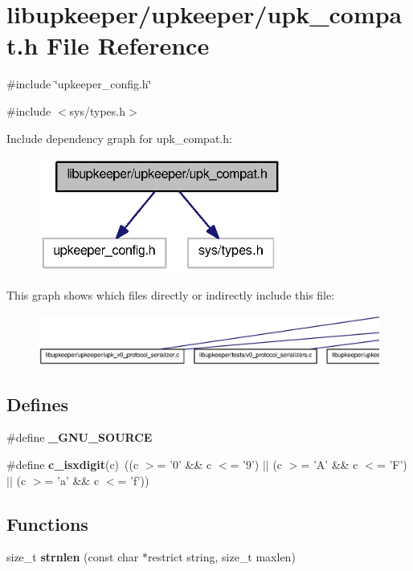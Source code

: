 \section{libupkeeper/upkeeper/upk\_\-compat.h File Reference}
\label{upk__compat_8h}
{\ttfamily \#include \char`\"{}upkeeper\_\-config.h\char`\"{}}\par
{\ttfamily \#include $<$sys/types.h$>$}\par
Include dependency graph for upk\_\-compat.h:
\nopagebreak
\begin{figure}[H]
\begin{center}
\leavevmode
\includegraphics[width=227pt]{upk__compat_8h__incl}
\end{center}
\end{figure}
This graph shows which files directly or indirectly include this file:
\nopagebreak
\begin{figure}[H]
\begin{center}
\leavevmode
\includegraphics[width=400pt]{upk__compat_8h__dep__incl}
\end{center}
\end{figure}
\subsection*{Defines}
\begin{DoxyCompactItemize}
\item 
\#define {\bf \_\-GNU\_\-SOURCE}
\item 
\#define {\bf c\_\-isxdigit}(c)~((c $>$= '0' \&\& c $<$= '9') $|$$|$ (c $>$= 'A' \&\& c $<$= 'F') $|$$|$ (c $>$= 'a' \&\& c $<$= 'f'))
\end{DoxyCompactItemize}
\subsection*{Functions}
\begin{DoxyCompactItemize}
\item 
size\_\-t {\bf strnlen} (const char $\ast$restrict string, size\_\-t maxlen)
\end{DoxyCompactItemize}


